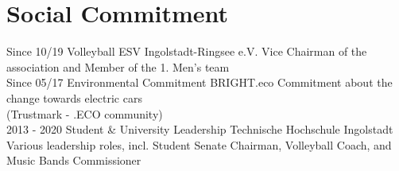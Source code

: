 \documentclass[]{friggeri-cv}
\begin{document}
\section{Social Commitment}
\begin{entrylist}
     \entry
    {Since 10/19}
    {Volleyball}
    {ESV Ingolstadt-Ringsee e.V.}
    {Vice Chairman of the association and Member of the 1. Men's team\\}
     \entry
    {Since 05/17}
    {Environmental Commitment}
    {BRIGHT.eco}
    {Commitment about the change towards electric cars \\(Trustmark - .ECO community)\\}
     \entry
    {2013 - 2020}
    {Student \& University Leadership}
    {Technische Hochschule Ingolstadt}
    {Various leadership roles, incl. Student Senate Chairman, Volleyball Coach, and Music Bands Commissioner\\}
%
\end{entrylist}
\end{document}
